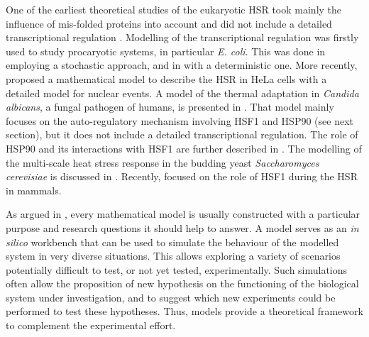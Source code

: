\documentclass[oneside, 10pt, a4paper, twocolumn]{article}
\begin{document}
One of the earliest theoretical studies of the eukaryotic HSR took mainly the influence of mis-folded proteins into account and did not include a detailed transcriptional regulation \cite{Peper1998}. 
Modelling of the transcriptional regulation was firstly used to study procaryotic
systems, in particular \emph{E. coli}.
This was done in \cite{Srivastava2001} employing a stochastic approach, and in \cite{Kurata2001} with a deterministic one. 
More recently, \cite{Rieger2005} %
proposed a mathematical model to describe the HSR in HeLa cells with a detailed model for nuclear events. 
A %
model of the thermal adaptation in \emph{Candida albicans}, a fungal pathogen of humans, is presented in \cite{Leach2012model}. 
That model mainly focuses on the auto-regulatory mechanism involving HSF1 and HSP90 (see next section), but it does not include a detailed transcriptional regulation. 
The role of HSP90 and its interactions with HSF1 are further described in \cite{Leach2012description}. 
The modelling of the multi-scale heat stress response in the budding yeast \emph{Saccharomyces cerevisiae} is discussed in \cite{Fonseca2012}. Recently, \cite{Sivery2015} focused on the role of HSF1 during the HSR in mammals. 

As argued in \cite{Matuszynska2015}, 
every mathematical model is usually constructed
with a particular purpose and research questions it should help to
answer. A model serves as an \textit{in silico} workbench that can be used
to simulate the behaviour of the modelled system in
very diverse situations. This allows exploring a variety of scenarios
potentially difficult to test, or not yet tested, experimentally.  
Such simulations often allow the proposition of new hypothesis on the functioning of the biological
system under investigation, and to suggest which new experiments could
be performed to test these hypotheses.
Thus, models provide a theoretical
framework to complement the experimental effort.
\end{document}
